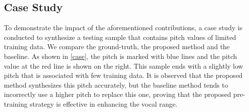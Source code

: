\subsection{Case Study}
To demonstrate the impact of the aforementioned contributions, a case study is conducted to synthesize a testing sample that contains pitch values of limited training data.
We compare the ground-truth, the proposed method and the baseline.
As shown in \ref{case}, the pitch is marked with blue lines and the pitch value at the red line is shown on the right. 
This sample ends with a slightly low pitch that is associated with few training data. 
It is observed that the proposed method synthesizes this pitch accurately, but the baseline method tends to incorrectly use a higher pitch to replace this one, proving that the proposed pre-training strategy is effective in enhancing the vocal range.
